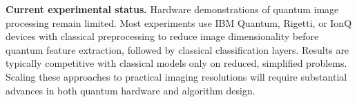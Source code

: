 \textbf{Current experimental status.} Hardware demonstrations of quantum image processing remain limited. Most experiments use IBM Quantum, Rigetti, or IonQ devices with classical preprocessing to reduce image dimensionality before quantum feature extraction, followed by classical classification layers. Results are typically competitive with classical models only on reduced, simplified problems. Scaling these approaches to practical imaging resolutions will require substantial advances in both quantum hardware and algorithm design.
